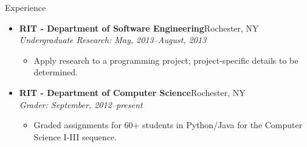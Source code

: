 \documentclass[11pt,oneside]{article}
\newenvironment{ressection}[1]{
	\vspace{1pt}
	{\fontfamily{phv}\selectfont\Large#1}
	\begin{itemize}
	\vspace{-2pt}
}{
	\end{itemize}
}
\newcommand{\resitem}[1]{
	\vspace{-4pt}
	\item \begin{flushleft} #1 \end{flushleft}
}
\newcommand{\ressubitem}[1]{
	\vspace{-5pt}
	\item \begin{flushleft} #1 \end{flushleft}
}
\newcommand{\resbigitem}[3]{
	\vspace{-5pt}
	\item
	\textbf{#1}\hfill#2 \\
	\textit{#3}
}
\newenvironment{ressubsec}[3]{
	\resbigitem{#1}{#2}{#3}
	\vspace{-5pt}
	\begin{itemize}
}{
	\end{itemize}
}
\begin{document}

\begin{ressection}{Experience}


	\begin{ressubsec}{RIT - Department of Software Engineering}{Rochester, NY}{Undergraduate Research: May, 2013--August, 2013}
		\ressubitem{Apply research to a programming project; project-specific details to be determined.}
	\end{ressubsec}

	\begin{ressubsec}{RIT - Department of Computer Science}{Rochester, NY}
{Grader: September, 2012--present}
		\ressubitem{Graded assignments for 60+ students in Python/Java for the  Computer Science I-III sequence.}
	\end{ressubsec}




\end{ressection}
\end{document}
